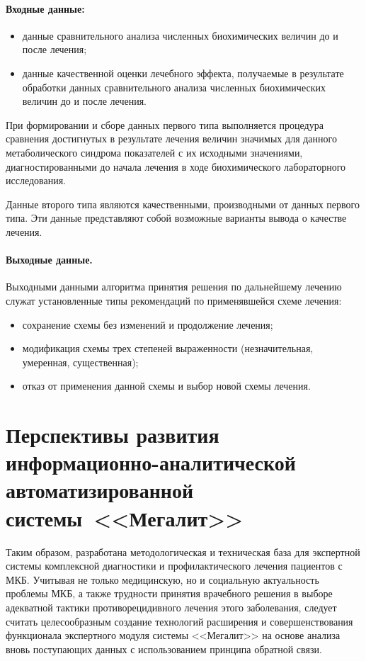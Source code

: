 \begin{multicols}{2}
      \paragraph*{Входные данные:}
      \begin{itemize}
\item данные сравнительного анализа численных биохимических величин до и после лечения;
\item данные качественной оценки лечебного эффекта, получаемые в результате обработки 
данных сравнительного анализа численных биохимических величин до и после лечения.
     \end{itemize}
     
     При формировании и сборе данных первого типа выполняется процедура сравнения 
достигнутых в результате лечения величин значимых для данного метаболического синдрома 
показателей с их исходными значениями, диагностированными до начала лечения в ходе 
биохимического лабораторного исследования.
     
     Данные второго типа являются качественными, производными от данных первого типа. 
Эти данные представляют собой возможные варианты вывода о качестве лечения.
     
     \paragraph*{Выходные данные.} Выходными данными алгоритма принятия решения по 
дальнейшему лечению служат установленные типы рекомендаций по применявшейся схеме 
лечения: 
     \begin{itemize}
\item сохранение схемы без изменений и продолжение лечения;
\item модификация схемы трех степеней выраженности 
(незначительная, умеренная, существенная);
\item отказ от применения данной схемы и выбор новой схемы лечения.
\end{itemize}

\section{Перспективы развития информационно-аналитической автоматизированной
системы~<<Мегалит>>}

      Таким образом, разработана методологическая и техническая база для экспертной 
системы комплексной диагностики и профилактического \mbox{лечения} пациентов с МКБ. Учитывая 
не только медицинскую, но и социальную актуальность проб\-ле\-мы МКБ, а также трудности 
принятия врачебного решения в выборе адекватной тактики противорецидивного лечения 
этого заболевания, следует считать целесообразным создание технологий расширения и 
совершенствования функционала экспертного модуля системы <<Мегалит>> на основе 
анализа вновь поступающих данных с использованием принципа обратной связи.
      

\end{multicols}
